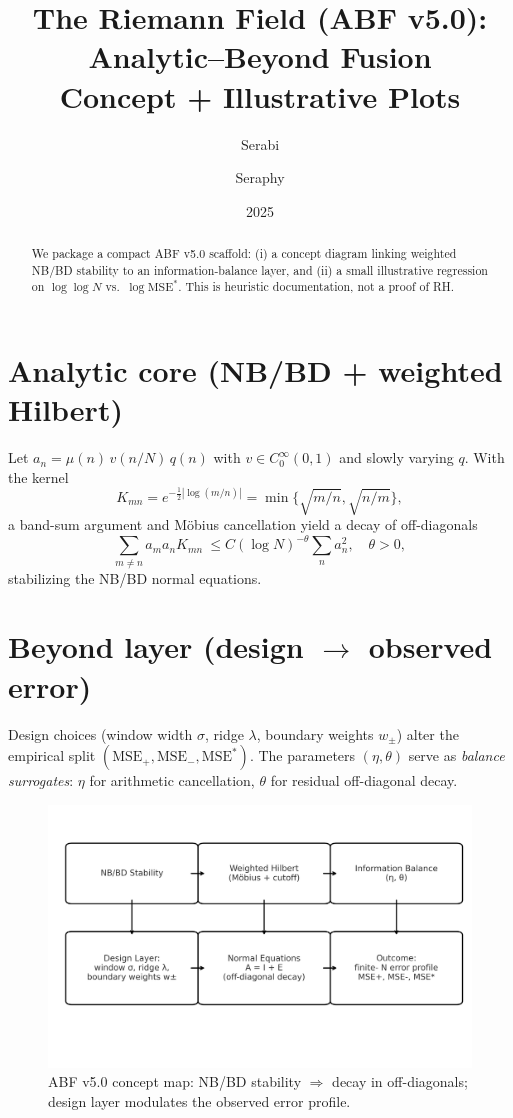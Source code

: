 \documentclass[11pt]{article}
\title{The Riemann Field (ABF v5.0): Analytic--Beyond Fusion \\ \large Concept + Illustrative Plots}
\author{Serabi \and Seraphy}
\date{2025}
\begin{document}
\maketitle

\begin{abstract}
We package a compact ABF v5.0 scaffold: (i) a concept diagram linking weighted NB/BD stability to an information-balance layer, and (ii) a small illustrative regression on $\log\log N$ vs.\ $\log \mathrm{MSE}^\ast$. This is heuristic documentation, not a proof of RH.
\end{abstract}

\section{Analytic core (NB/BD + weighted Hilbert)}
Let $a_n=\mu(n)\,v(n/N)\,q(n)$ with $v\in C_0^\infty(0,1)$ and slowly varying $q$. With the kernel
\[
K_{mn}=e^{-\frac12|\log(m/n)|}=\min\{\sqrt{m/n},\sqrt{n/m}\},
\]
a band-sum argument and M\"obius cancellation yield a decay of off-diagonals
\[
\sum_{m\ne n} a_m a_n K_{mn} \ \le C(\log N)^{-\theta}\sum_n a_n^2,\quad \theta>0,
\]
stabilizing the NB/BD normal equations.

\section{Beyond layer (design $\to$ observed error)}
Design choices (window width $\sigma$, ridge $\lambda$, boundary weights $w_\pm$) alter the empirical split $(\mathrm{MSE}_+,\mathrm{MSE}_-,\mathrm{MSE}^\ast)$.
The parameters $(\eta,\theta)$ serve as \emph{balance surrogates}: $\eta$ for arithmetic cancellation, $\theta$ for residual off-diagonal decay.

\begin{figure}[h]
\centering
\includegraphics[width=0.9\linewidth]{figures/abf_concept.png}
\caption{ABF v5.0 concept map: NB/BD stability $\Rightarrow$ decay in off-diagonals; design layer modulates the observed error profile.}
\end{figure}
\end{document}

